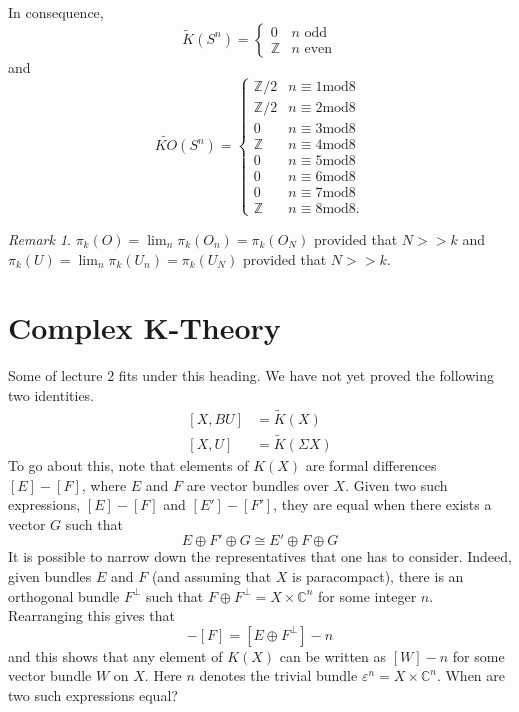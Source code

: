 \documentclass[a4paper,10pt]{article}
\theoremstyle{plain}%
\theoremstyle{definition}
\theoremstyle{remark}
\newtheorem{rem}{Remark}
\newcommand{\ZZ}{\mathbb{Z}}
\newcommand{\CC}{\mathbb{C}}
\renewcommand{\epsilon}{\varepsilon}
\newcommand{\eps}{\epsilon}
\begin{document}
In consequence,
\[ \tilde{K}(S^n) = \begin{cases} 0 & n\text{ odd}\\
\ZZ & n\text{ even}
\end{cases}
\]
and \[ \tilde{KO}(S^n) = 
\begin{cases} 
\ZZ / 2 & n\equiv 1\text{mod}8\\
\ZZ / 2 & n\equiv 2\text{mod}8\\
0       & n\equiv 3\text{mod}8\\
\ZZ     & n\equiv 4\text{mod}8\\
0       & n\equiv 5\text{mod}8\\
0       & n\equiv 6\text{mod}8\\
0       & n\equiv 7\text{mod}8\\
\ZZ     & n\equiv 8\text{mod}8.
\end{cases}
\]

\begin{rem}
$\pi_k(O) =\lim_n\pi_k(O_n)=\pi_k(O_N)$ provided that $N>>k$ and 
$\pi_k(U) =\lim_n\pi_k(U_n)=\pi_k(U_N)$ provided that $N>>k.$
\end{rem}

\section{Complex K-Theory}

Some of lecture 2 fits under this heading.
We have not yet proved the following two identities.
\begin{align}
  \label{xbu-is-kx} [X, BU] &= \tilde{K}(X)\\
  \label{xu-is-ksx}[X, U] &= \tilde{K}(\Sigma X)
\end{align}
To go about this, note that elements of $K(X)$ are formal differences
$[E]-[F]$, where $E$ and $F$ are vector bundles over $X$. Given two
such expressions, $[E]-[F]$ and $[E']-[F']$, they are equal when there
exists a vector $G$ such that
\begin{equation*}
  E\oplus F' \oplus G \cong E' \oplus F \oplus G
\end{equation*}
It is possible to narrow down the representatives that one has to
consider. Indeed, given bundles $E$ and $F$ (and assuming that $X$ is
paracompact), there is an orthogonal bundle $F^\perp$ such that
$F\oplus F^\perp = X \times \CC^n$ for some integer $n$. Rearranging
this gives that
\begin{equation*}
  [E]-[F] = [E\oplus F^\perp] - n
\end{equation*}
and this shows that any element of $K(X)$ can be written as $[W]-n$
for some vector bundle $W$ on $X$. Here $n$ denotes the trivial bundle
$\eps^n = X\times \CC^n$. When are two such expressions equal?
\end{document}
